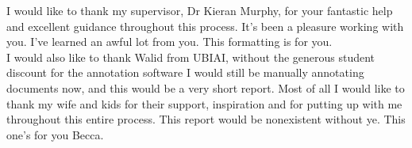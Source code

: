 I would like to thank my supervisor, Dr Kieran Murphy, for your fantastic help and excellent guidance throughout this process. It's been
a pleasure working with you. I've learned an awful lot from you. This formatting is for you.\\
I would also like to thank Walid from UBIAI, without the generous student discount for the annotation software I would still 
be manually annotating documents now, and this would be a very short report.
\bigbreak
Most of all I would like to thank my wife and kids for their support, inspiration and for putting up with me throughout this entire 
process. This report would be nonexistent without ye. This one's for you Becca. 
